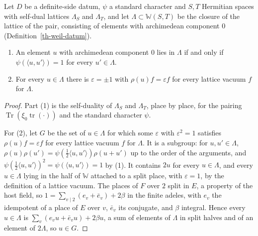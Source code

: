 \begin{lemma}\label{th-lattice-signs}
Let $D$ be a definite-side datum, $\psi$ a standard character and $S,T$
Hermitian spaces with self-dual lattices $\Lambda_S$ and $\Lambda_T$, and let
$\Lambda\subset\mathbb W(S,T)$ be the closure of the lattice of the pair,
consisting of elements with archimedean component $0$
(Definition~\ref{th-weil-datum}).
\begin{enumerate}
\item An element $u$ with archimedean component $0$ lies in $\Lambda$ if and only
  if $\psi(\langle u,u'\rangle)=1$ for every $u'\in\Lambda$.
\item For every $u\in\Lambda$ there is $\varepsilon=\pm1$ with
  $\rho(u)f=\varepsilon f$ for every lattice vacuum $f$ for $\Lambda$.
\end{enumerate}
\end{lemma}
\begin{proof}
Part (1) is the self-duality of $\Lambda_S$ and $\Lambda_T$, place by place, for
the pairing $\operatorname{Tr}(\xi_0\operatorname{tr}(\cdot))$ and the standard
character $\psi$.

For (2), let $G$ be the set of $u\in\Lambda$ for which some $\varepsilon$ with
$\varepsilon^2=1$ satisfies $\rho(u)f=\varepsilon f$ for every lattice vacuum
$f$ for $\Lambda$. It is a subgroup: for $u,u'\in\Lambda$,
$\rho(u)\rho(u')=\psi(\frac12\langle u,u'\rangle)\rho(u+u')$ up to the order of
the arguments, and $\psi(\frac12\langle u,u'\rangle)^2=\psi(\langle u,u'\rangle)=1$
by (1). It contains $2u$ for every $u\in\Lambda$, and every $u\in\Lambda$ lying
in the half of $\mathbb W$ attached to a split place, with $\varepsilon=1$, by
the definition of a lattice vacuum. The places of $F$ over $2$ split in $E$, a
property of the host field, so $1=\sum_{v\mid2}(e_v+\bar e_v)+2\beta$ in the
finite adeles, with $e_v$ the idempotent of a place of $E$ over $v$, $\bar e_v$
its conjugate, and $\beta$ integral. Hence every $u\in\Lambda$ is
$\sum_v(e_vu+\bar e_vu)+2\beta u$, a sum of elements of $\Lambda$ in split
halves and of an element of $2\Lambda$, so $u\in G$.
\end{proof}

